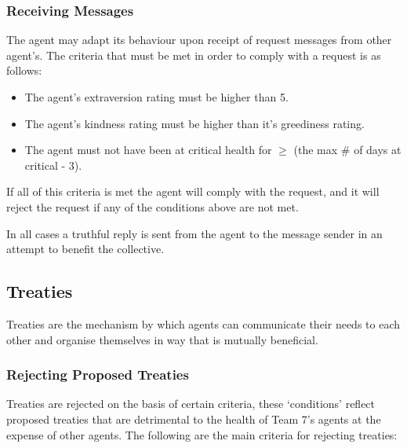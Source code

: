 \subsubsection{Receiving Messages}
\label{subsubsec: Receiving Messages}
The agent may adapt its behaviour upon receipt of request messages from other agent's. The criteria that must be met in order to comply with a request is as follows: 

\begin{itemize}
  \item The agent's extraversion rating must be higher than 5.
  \item The agent's kindness rating must be higher than it's greediness rating.
  \item The agent must not have been at critical health for \(\ge\) (the max \# of days at critical - 3).
\end{itemize}

If all of this criteria is met the agent will comply with the request, and it will reject the request if any of the conditions above are not met.

In all cases a truthful reply is sent from the agent to the message sender in an attempt to benefit the collective.

\subsection{Treaties}
\label{subsec: Treaties}
Treaties are the mechanism by which agents can communicate their needs to each other and organise themselves in way that is mutually beneficial.  

\subsubsection{Rejecting Proposed Treaties}
\label{subsec: Rejecting Treaties}
Treaties are rejected on the basis of certain criteria, these `conditions' reflect proposed treaties that are detrimental to the health of Team 7's agents at the expense of other agents. The following are the main criteria for rejecting treaties:

